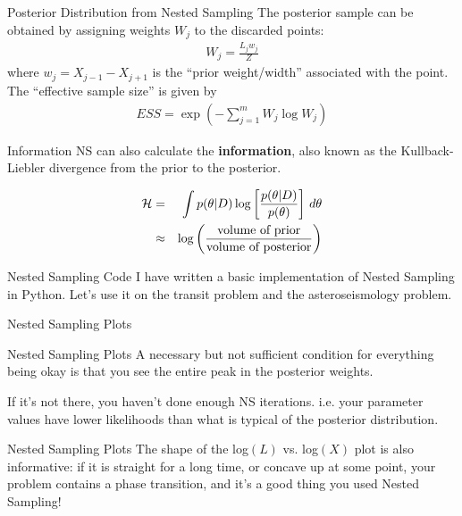 \documentclass{beamer}
\begin{document}
\begin{frame}[t]{Posterior Distribution from Nested Sampling}
The posterior sample can be obtained by assigning weights $W_j$ to the
discarded points:
\begin{align*}
W_{j} = \frac{L_{j} w_{j}}{Z} 
\end{align*}
where $w_{j}=X_{j-1} - X_{j+1}$ is the ``prior weight/width'' associated with the
point. The ``effective sample size'' is given by
\begin{align*}
ESS = \exp \left( - \sum_{j=1}^{m} W_j \log W_j \right)
\end{align*}

\end{frame}

\begin{frame}[t]{Information}
NS can also calculate the {\bf information}, also known as the Kullback-Liebler
divergence from the prior to the posterior.

\begin{eqnarray*}
\mathcal{H} &=& \int p(\theta | D) \log\left[\frac{p(\theta | D)}{p(\theta)}\right]
\, d\theta\\
&\approx& \log\left(
\frac{\textnormal{volume of prior}}{\textnormal{volume of posterior}}
\right)
\end{eqnarray*}
\end{frame}

\begin{frame}[t]{Nested Sampling Code}
I have written a basic implementation of Nested Sampling in Python. Let's
use it on the transit problem and the asteroseismology problem.

\end{frame}

\begin{frame}[t]{Nested Sampling Plots}
\vspace{-10pt}

\end{frame}

\begin{frame}[t]{Nested Sampling Plots}
A necessary but not sufficient condition for everything being okay is that you
see the entire peak in the posterior weights.\\

\vspace{20pt}

If it's not there, you haven't done enough NS iterations. i.e. your parameter
values have lower likelihoods than what is typical of the posterior distribution.
\end{frame}

\begin{frame}[t]{Nested Sampling Plots}
The shape of the log$(L)$ vs. log$(X)$ plot is also informative: if it is
straight for a long time, or concave up at some point, your problem contains
a phase transition, and it's a good thing you used Nested Sampling!
\end{frame}
\end{document}
